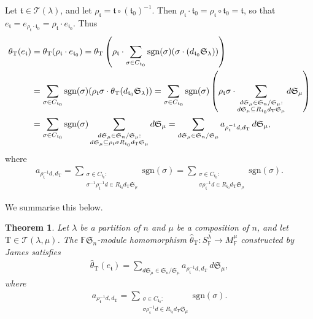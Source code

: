 \documentclass[pdftex]{sigma}
\newtheorem{Theorem}{Theorem}[section]
\renewcommand{\t}{\mathfrak{t}}
\newcommand{\TT}{\mathscr{T}}
\newcommand{\T}{\mathrm{T}}
\newcommand{\sgn}{\mathrm{sgn}}
\newcommand{\sym}[1]{\mathfrak{S}_{#1}}
\newcommand{\F}{\mathbb{F}}
\begin{document}
Let $\t \in \TT(\lambda)$, and let $\rho_{\t} = \t \circ (\t_0)^{-1}$. Then $\rho_{\t} \cdot \t_0 = \rho_{\t} \circ \t_0 = \t$, so that $e_{\t} = e_{\rho_{\t} \cdot \t_0} = \rho_{\t} \cdot e_{\t_0}$. Thus
\begin{align*}\allowdisplaybreaks
\theta_{\T}(e_{\t}) &= \theta_{\T}(\rho_{\t} \cdot e_{\t_0})
= \theta_{\T}\left (\rho_{\t} \cdot \sum_{\sigma \in C_{\t_0}} \sgn(\sigma) (\sigma \cdot (d_{\t_0} \sym{\lambda}))\right ) \\
&= \sum_{\sigma \in C_{\t_0}} \sgn(\sigma) (\rho_{\t} \sigma \cdot \theta_{\T}(d_{\t_0} \sym{\lambda}))
= \sum_{\sigma \in C_{\t_0}} \sgn(\sigma) \left(\rho_{\t}\sigma \cdot \sum_{\substack{d\sym{\mu} \in \sym{n}/\sym{\mu} : \\ d\sym{\mu} \subseteq R_{\t_0} d_\T \sym{\mu}}} d \sym{\mu} \right) \\
&= \sum_{\sigma \in C_{\t_0}} \sgn(\sigma) \sum_{\substack{d\sym{\mu} \in \sym{n}/\sym{\mu} : \\ d\sym{\mu} \subseteq \rho_{\t} \sigma R_{\t_0} d_\T \sym{\mu}}} d \sym{\mu}
= \sum_{d \sym{\mu} \in \sym{n}/\sym{\mu}} a_{\rho_\t^{-1}d,d_\T} \, d\sym{\mu},
\end{align*}where
\begin{gather*}
a_{\rho_\t^{-1}d,d_\T}= \sum_{\substack{\sigma \in C_{\t_0} : \\ \sigma^{-1} \rho_{\t}^{-1} d \in R_{\t_0} d_{\T} \sym{\mu}}} \sgn(\sigma) =
\sum_{\substack{\sigma \in C_{\t_0} : \\ \sigma \rho_{\t}^{-1} d \in R_{\t_0} d_{\T} \sym{\mu}}} \sgn(\sigma).
\end{gather*}

We summarise this below.

\begin{Theorem} \label{T:JamesTheta}
Let $\lambda$ be a partition of $n$ and $\mu$ be a composition of $n$, and
let $\T \in \TT(\lambda,\mu)$.
The $\F\sym{n}$-module homomorphism $\hat{\theta}_{\T} \colon S_\F^{\lambda} \to M_\F^{\mu}$ constructed by James satisfies
\begin{gather*}
\hat{\theta}_{\T}(e_{\t}) = \sum_{d \sym{\mu} \in \sym{n}/\sym{\mu}} a_{\rho_\t^{-1}d,d_\T} \, d\sym{\mu},
\end{gather*} where
\begin{gather*}
a_{\rho_\t^{-1}d,d_\T} = \sum_{\substack{\sigma \in C_{\t_0} : \\ \sigma \rho_{\t}^{-1} d \in R_{\t_0} d_{\T} \sym{\mu}}} \sgn(\sigma).
\end{gather*}
\end{Theorem}
\end{document}
